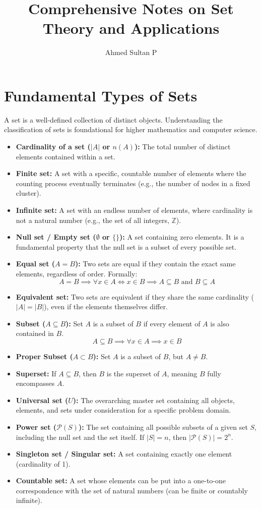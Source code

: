 \documentclass{article}
\title{Comprehensive Notes on Set Theory and Applications}
\author{Ahmed Sultan P}
\date{}
\begin{document}
\maketitle

\section{Fundamental Types of Sets}
A set is a well-defined collection of distinct objects. Understanding the classification of sets is foundational for higher mathematics and computer science.

\begin{itemize}
    \item \textbf{Cardinality of a set ($|A|$ or $n(A)$):} The total number of distinct elements contained within a set.
    \item \textbf{Finite set:} A set with a specific, countable number of elements where the counting process eventually terminates (e.g., the number of nodes in a fixed cluster).
    \item \textbf{Infinite set:} A set with an endless number of elements, where cardinality is not a natural number (e.g., the set of all integers, $\mathbb{Z}$).
    \item \textbf{Null set / Empty set ($\emptyset$ or $\{\}$):} A set containing zero elements. It is a fundamental property that the null set is a subset of every possible set.
    \item \textbf{Equal set ($A = B$):} Two sets are equal if they contain the exact same elements, regardless of order. Formally: 
    $$A = B \implies \forall x \in A \iff x \in B \implies A \subseteq B \text{ and } B \subseteq A$$
    \item \textbf{Equivalent set:} Two sets are equivalent if they share the same cardinality ($|A| = |B|$), even if the elements themselves differ.
    \item \textbf{Subset ($A \subseteq B$):} Set $A$ is a subset of $B$ if every element of $A$ is also contained in $B$. 
    $$A \subseteq B \implies \forall x \in A \implies x \in B$$
    \item \textbf{Proper Subset ($A \subset B$):} Set $A$ is a subset of $B$, but $A \neq B$. 
    \item \textbf{Superset:} If $A \subseteq B$, then $B$ is the superset of $A$, meaning $B$ fully encompasses $A$.
    \item \textbf{Universal set ($U$):} The overarching master set containing all objects, elements, and sets under consideration for a specific problem domain.
    \item \textbf{Power set ($\mathcal{P}(S)$):} The set containing all possible subsets of a given set $S$, including the null set and the set itself. If $|S| = n$, then $|\mathcal{P}(S)| = 2^n$.
    \item \textbf{Singleton set / Singular set:} A set containing exactly one element (cardinality of 1).
    \item \textbf{Countable set:} A set whose elements can be put into a one-to-one correspondence with the set of natural numbers (can be finite or countably infinite).
\end{itemize}
\newpage
\end{document}
